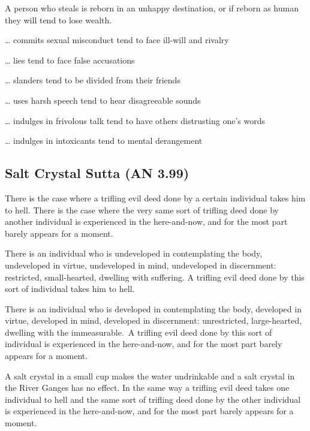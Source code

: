 \documentclass[a4 paper, 12pt]{article}
\begin{document}
A person who steals is reborn in an unhappy destination, or if reborn as human they will tend to lose wealth.

… commits sexual misconduct \textrightarrow \hspace{1mm} tend to face ill-will and rivalry

… lies \textrightarrow \hspace{1mm} tend to face false accusations

… slanders \textrightarrow \hspace{1mm} tend to be divided from their friends

… uses harsh speech \textrightarrow \hspace{1mm} tend to hear disagreeable sounds

… indulges in frivolous talk \textrightarrow \hspace{1mm} tend to have others distrusting one’s words

… indulges in intoxicants \textrightarrow \hspace{1mm} tend to mental derangement

\subsection*{Salt Crystal Sutta (AN 3.99)}

There is the case where a trifling evil deed done by a certain individual takes him to hell. There is the case where the very same sort of trifling deed done by another individual is experienced in the here-and-now, and for the most part barely appears for a moment.

There is an individual who is undeveloped in contemplating the body, undeveloped in virtue, undeveloped in mind, undeveloped in discernment: restricted, small-hearted, dwelling with suffering. A trifling evil deed done by this sort of individual takes him to hell.

There is an individual who is developed in contemplating the body, developed in virtue, developed in mind, developed in discernment: unrestricted, large-hearted, dwelling with the immeasurable. A trifling evil deed done by this sort of individual is experienced in the here-and-now, and for the most part barely appears for a moment. 

A salt crystal in a small cup makes the water undrinkable and a salt crystal in the River Ganges has no effect. In the same way a trifling evil deed takes one individual to hell and the same sort of trifling deed done by the other individual is experienced in the here-and-now, and for the most part barely appears for a moment.
\end{document}
